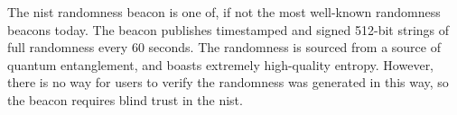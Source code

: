 The \gls{nist} randomness beacon is one of, if not the most well-known randomness beacons today.
The beacon publishes timestamped and signed 512-bit strings of full randomness every 60 seconds.
The randomness is sourced from a source of quantum entanglement, and boasts extremely high-quality entropy.
However, there is no way for users to verify the randomness was generated in this way, so the beacon requires blind trust in the \acrfull{nist}.
